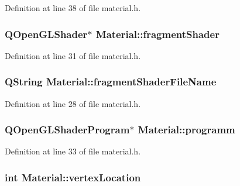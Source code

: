 Definition at line 38 of file material.\+h.

\hypertarget{class_material_a9a2cb05e65584fa9d4f0f4f0af74d55e}{}
\subsubsection[{fragment\+Shader}]{\setlength{\rightskip}{0pt plus 5cm}Q\+Open\+G\+L\+Shader$\ast$ Material\+::fragment\+Shader\hspace{0.3cm}{\ttfamily [protected]}}\label{class_material_a9a2cb05e65584fa9d4f0f4f0af74d55e}


Definition at line 31 of file material.\+h.

\hypertarget{class_material_a8adf8679e41e341b339f3460c3ba45ee}{}
\subsubsection[{fragment\+Shader\+File\+Name}]{\setlength{\rightskip}{0pt plus 5cm}Q\+String Material\+::fragment\+Shader\+File\+Name\hspace{0.3cm}{\ttfamily [protected]}}\label{class_material_a8adf8679e41e341b339f3460c3ba45ee}


Definition at line 28 of file material.\+h.

\hypertarget{class_material_aa5f04d76a6b53bfb6eba238db8328490}{}
\subsubsection[{programm}]{\setlength{\rightskip}{0pt plus 5cm}Q\+Open\+G\+L\+Shader\+Program$\ast$ Material\+::programm\hspace{0.3cm}{\ttfamily [protected]}}\label{class_material_aa5f04d76a6b53bfb6eba238db8328490}


Definition at line 33 of file material.\+h.

\hypertarget{class_material_ac1241a29b62d04848cdc190f1de85849}{}
\subsubsection[{vertex\+Location}]{\setlength{\rightskip}{0pt plus 5cm}int Material\+::vertex\+Location\hspace{0.3cm}{\ttfamily [protected]}}\label{class_material_ac1241a29b62d04848cdc190f1de85849}


